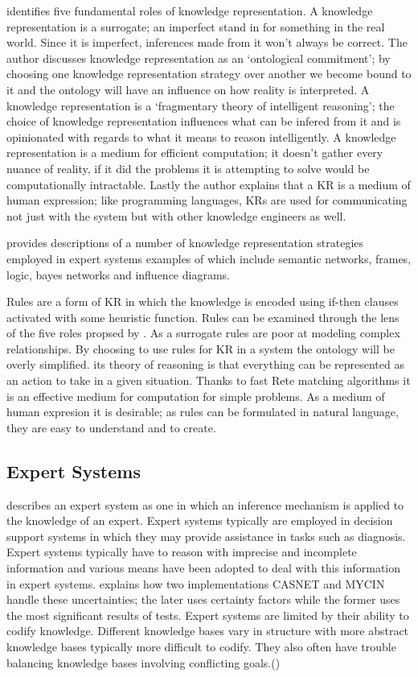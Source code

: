 \cite{davis1993knowledge} identifies five fundamental roles of knowledge representation. A knowledge representation is a surrogate; an imperfect stand in for something in the real world. Since it is imperfect, inferences made from it won't always be correct. The author discusses knowledge representation as an `ontological commitment'; by choosing one knowledge representation strategy over another we become bound to it and the ontology will have an influence on how reality is interpreted. A knowledge representation is a `fragmentary theory of intelligent reasoning'; the choice of knowledge representation influences what can be infered from it and is opinionated with regards to what it means to reason intelligently. A knowledge representation is a medium for efficient computation; it doesn't gather every nuance of reality, if it did the problems it is attempting to solve would be computationally intractable. Lastly the author explains that a KR is a medium of human expression; like programming languages, KRs are used for communicating not just with the system but with other knowledge engineers as well.

\cite{petrik2004knowledge} provides descriptions of a number of knowledge representation strategies employed in expert systems examples of which include semantic networks, frames, logic, bayes networks and influence diagrams. 

Rules are a form of KR in which the knowledge is encoded using if-then clauses activated with some heuristic function. Rules can be examined through the lens of the five roles propsed by \cite{davis1993knowledge}. As a surrogate rules are poor at modeling complex relationships. By choosing to use rules for KR in a system the ontology will be overly simplified. its theory of reasoning is that everything can be represented as an action to take in a given situation. Thanks to fast Rete matching algorithms it is an effective medium for computation for simple problems. As a medium of human expresion it is desirable; as rules can be formulated in natural language, they are easy to understand and to create.

\subsection{Expert Systems}

\cite{todd1992introduction} describes an expert system as one in which an inference mechanism is applied to the knowledge of an expert. Expert systems typically are employed in decision support systems in which they may provide assistance in tasks such as diagnosis. Expert systems typically have to reason with imprecise and incomplete information and various means have been adopted to deal with this information in expert systems. \cite{kandel1991fuzzy} explains how two implementations CASNET and MYCIN handle these uncertainties; the later uses certainty factors while the former uses the most significant results of tests. Expert systems are limited by their ability to codify knowledge. Different knowledge bases vary in structure with more abstract knowledge bases typically more difficult to codify. They also often have trouble balancing knowledge bases involving conflicting goals.(\cite{cowan2001expert})

